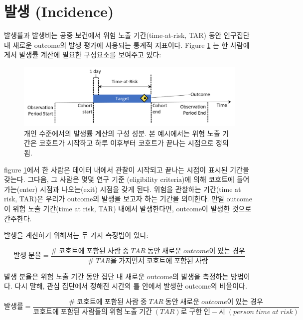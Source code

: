 \documentclass[11pt]{book}
\theoremstyle{definition}
\theoremstyle{definition}
\theoremstyle{definition}
\theoremstyle{remark}
\begin{document}
\section{발생 (Incidence)}\label{-incidence}

발생률과 발생비는 공중 보건에서 위험 노출 기간(time-at-risk, TAR) 동안
인구집단 내 새로운 outcome의 발생 평가에 사용되는 통계적 지표이다.
Figure \ref{fig:incidenceTimeline} 는 한 사람에게서 발생률 계산에 필요한
구성요소를 보여주고 있다: 

\begin{figure}

{\centering \includegraphics[width=1\linewidth]{images/Characterization/incidenceTimeline} 

}

\caption{개인 수준에서의 발생률 계산의 구성 성분. 본 예시에서는 위험 노출 기간은 코호트가 시작하고 하루 이후부터 코호트가 끝나는 시점으로 정의됨.}\label{fig:incidenceTimeline}
\end{figure}

figure \ref{fig:incidenceTimeline}에서 한 사람은 데이터 내에서 관찰이
시작되고 끝나는 시점이 표시된 기간을 갖는다. 그다음, 그 사람은 몇몇 연구
기준 (eligibility criteria)에 의해 코호트에 들어가는(enter) 시점과
나오는(exit) 시점을 갖게 된다. 위험을 관찰하는 기간(time at risk, TAR)은
우리가 outcome의 발생을 보고자 하는 기간을 의미한다. 만일 outcome이 위험
노출 기간(time at risk, TAR) 내에서 발생한다면, outcome이 발생한 것으로
간주한다.

발생을 계산하기 위해서는 두 가지 측정법이 있다:

\[ 
발생\;분율 = \frac{\#\;코호트에\;포함된\;사람\;중\;TAR\;동안\;새로운\;outcome이\;있는\;경우}{\#\;TAR을\;가지면서\;코호트에\;포함된\;사람}
\]

발생 분율은 위험 노출 기간 동안 집단 내 새로운 outcome의 발생을 측정하는
방법이다. 다시 말해, 관심 집단에서 정해진 시간의 틀 안에서 발생한
outcome의 비율이다. 

\[
발생률 = \frac{\#\;코호트에\;포함된\;사람\;중\;TAR\;동안\;새로운\;outcome이\;있는\;경우}{코호트에\;포함된\;사람들의\;위험\;노출\;기간\;(TAR)로\;구한\;인-시\;(person\;time\;at\;risk)}
\]
\end{document}
